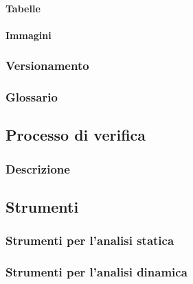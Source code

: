\paragraph{Tabelle}

\paragraph{Immagini}

\subsubsection{Versionamento}

\subsubsection{Glossario}

\subsection{Processo di verifica}

\subsubsection{Descrizione}

\subsection{Strumenti}

\subsubsection{Strumenti per l'analisi statica}

\subsubsection{Strumenti per l'analisi dinamica}



